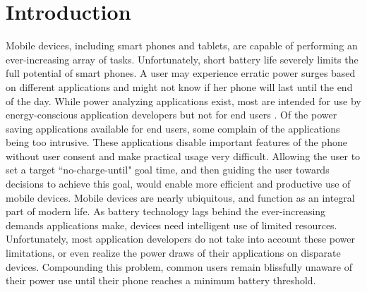 \section*{Introduction}
Mobile devices, including smart phones and tablets, are capable of performing an ever-increasing array of tasks. 
Unfortunately, short battery life severely limits the full potential of smart phones. 
A user may experience erratic power surges based on different applications and might not know if her phone will last until the end of the day. 
While power analyzing applications exist, most are intended for use by energy-conscious application developers but not for end users \cite{eprof} \cite{energy-aware}. 
Of the power saving applications available for end users, some complain of the applications being too intrusive. 
These applications disable important features of the phone without user consent and make practical usage very difficult. 
Allowing the user to set a target ``no-charge-until" goal time, and then guiding the user towards decisions to achieve this goal, would enable more efficient and productive use of mobile devices.
Mobile devices are nearly ubiquitous, and function as an integral part of modern life. 
As battery technology lags behind the ever-increasing demands applications make, devices need intelligent use of limited resources. 
Unfortunately, most application developers do not take into account these power limitations, or even realize the power draws of their applications on disparate devices. 
Compounding this problem, common users remain blissfully unaware of their power use until their phone reaches a minimum battery threshold.

